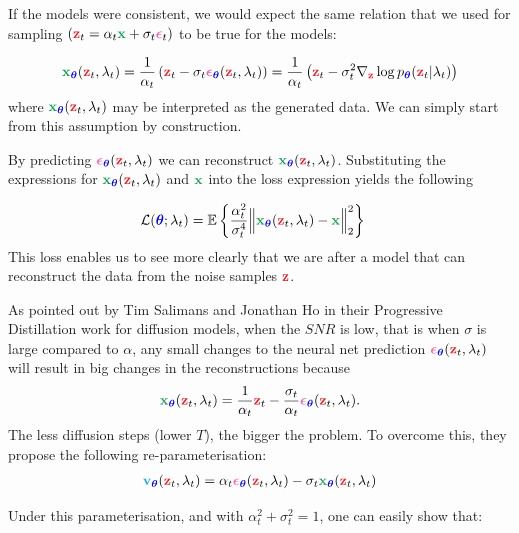 \documentclass[usenames,dvipsnames]{article}
\DeclarePairedDelimiter{\norm}{\lVert}{\rVert}
\newcommand{\myvec}[1]{\mathbf{#1}}
\newcommand{\myvecsym}[1]{\boldsymbol{#1}}
\newcommand{\vx}{\myvec{\textcolor{ForestGreen}{x}}}
\newcommand{\vz}{\myvec{\textcolor{Red}{z}}}
\newcommand{\vv}{\myvec{\textcolor{Cyan}{v}}}
\newcommand{\vtheta}{\myvecsym{\textcolor{blue}{\theta}}}
\newcommand{\vepsilon}{\myvecsym{\textcolor{CarnationPink}{\epsilon}}}
\newcommand{\loss}{{\cal L}}
\newcommand{\E}{\mathbb{E}} %
\newcommand{\pT}{p_{\vtheta}}
\begin{document}
If the models were consistent, we would expect the same relation that we used for sampling $(\vz_t = \alpha_t \vx + \sigma_t \vepsilon_t )$ to be true for the models:

\begin{align}
\vx_{\vtheta}(\vz_t,\lambda_t) = \frac{1}{\alpha_t} \left( \vz_t - \sigma_t  \vepsilon_{\vtheta}(\vz_t,\lambda_t) \right)
= \frac{1}{\alpha_t} \left( \vz_t - \sigma_t^2  \nabla_\vz \log \pT(\vz_t | \lambda_t)  \right)
\end{align}
where $\vx_{\vtheta}(\vz_t,\lambda_t)$ may be interpreted as the generated data. We can simply start from this assumption by construction.  

By predicting $\vepsilon_{\vtheta}(\vz_t,\lambda_t)$ we can reconstruct $\vx_{\vtheta}(\vz_t,\lambda_t)$. Substituting the expressions for $\vx_{\vtheta}(\vz_t,\lambda_t)$ and $\vx$ into the loss expression yields the following

\begin{align}
  \loss(\vtheta;\lambda_t)
&=
  \E
 \left\{  \frac{\alpha_t^2}{\sigma_t^4}
 \norm[\Big]{\vx_{\vtheta}(\vz_t,\lambda_t)
   - \vx }_2^2 \right\}
\nonumber
\end{align}
This loss enables us to see more clearly that we are after a model that can reconstruct the data from the noise samples $\vz$.



As pointed out by Tim Salimans and Jonathan Ho in their Progressive Distillation work for diffusion models,
when the $SNR$ is low, that is when $\sigma$ is large compared to $\alpha$, any small changes to the neural net prediction $\vepsilon_{\vtheta}(\vz_t,\lambda_t)$ will result in big changes in the reconstructions because
\begin{align}
\vx_{\vtheta}(\vz_t,\lambda_t) = \frac{1}{\alpha_t}  \vz_t - \frac{\sigma_t}{\alpha_t}  \vepsilon_{\vtheta}(\vz_t,\lambda_t).
\end{align}
The less diffusion steps (lower $T$), the bigger the problem.  To overcome this, they propose the following re-parameterisation:
\begin{align}
\vv_{\vtheta}(\vz_t,\lambda_t) = \alpha_t  \vepsilon_{\vtheta}(\vz_t,\lambda_t) - \sigma_t  \vx_{\vtheta}(\vz_t,\lambda_t)
\end{align}
 
Under this parameterisation, and with $\alpha_t^2 + \sigma_t^2 = 1$, one can easily show that:
\end{document}
